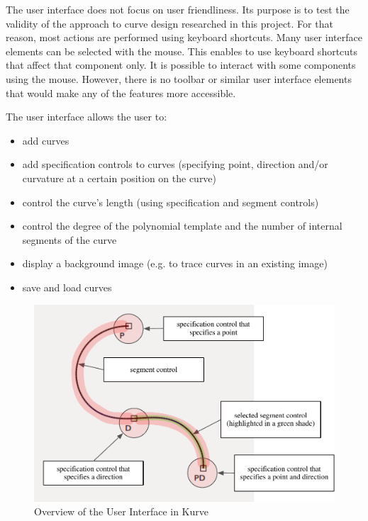 \documentclass[a4paper]{article}
\begin{document}
				The user interface does not focus on user friendliness. Its purpose is to test the validity of the approach to curve design researched in this project. For that reason, most actions are performed using keyboard shortcuts. Many user interface elements can be selected with the mouse. This enables to use keyboard shortcuts that affect that component only. It is possible to interact with some components using the mouse. However, there is no toolbar or similar user interface elements that would make any of the features more accessible.
				
				The user interface allows the user to:
				\begin{itemize}
					\item add curves
					\item add specification controls to curves (specifying point, direction and/or curvature at a certain position on the curve) 
					\item control the curve's length (using specification and segment controls)
					\item control the degree of the polynomial template and the number of internal segments of the curve
					\item display a background image (e.g. to trace curves in an existing image)
					\item save and load curves
				\end{itemize}
				
				\begin{figure}[htb]
					\centering
					\includegraphics[width=130mm]{content/output/ui_components.pdf}
					\caption{Overview of the User Interface in Kurve}
					\label{figure:ui_components}
				\end{figure}
				
\end{document}
